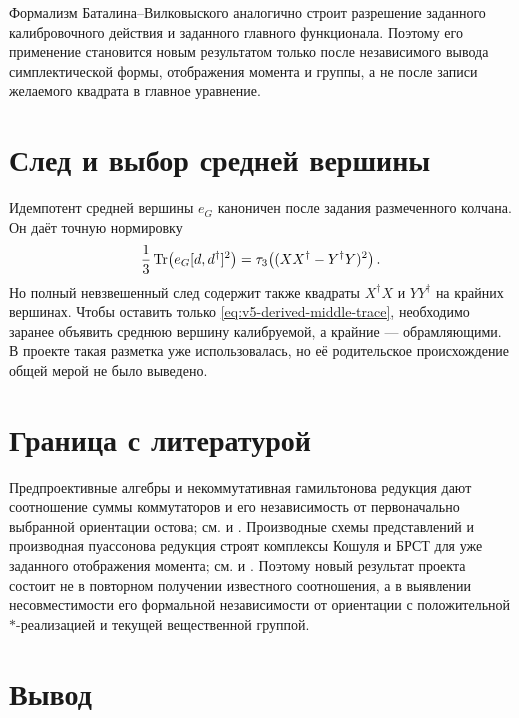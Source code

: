 Формализм Баталина--Вилковыского аналогично строит разрешение заданного
калибровочного действия и заданного главного функционала. Поэтому его
применение становится новым результатом только после независимого вывода
симплектической формы, отображения момента и группы, а не после записи
желаемого квадрата в главное уравнение.

\section{След и выбор средней вершины}

Идемпотент средней вершины \(e_G\) каноничен после задания размеченного
колчана. Он даёт точную нормировку
\begin{equation}
 \frac13\operatorname{Tr}\!\left(e_G[d,d^\dagger]^2\right)
 =\tau_3\!\left((XX^\dagger-Y^\dagger Y)^2\right).
 \label{eq:v5-derived-middle-trace}
\end{equation}
Но полный невзвешенный след содержит также квадраты \(X^\dagger X\) и
\(YY^\dagger\) на крайних вершинах. Чтобы оставить только
\eqref{eq:v5-derived-middle-trace}, необходимо заранее объявить среднюю
вершину калибруемой, а крайние --- обрамляющими. В проекте такая разметка
уже использовалась, но её родительское происхождение общей мерой не было
выведено.

\section{Граница с литературой}

Предпроективные алгебры и некоммутативная гамильтонова редукция дают
соотношение суммы коммутаторов и его независимость от первоначально
выбранной ориентации остова; см.
 и .
Производные схемы представлений и производная пуассонова редукция строят
комплексы Кошуля и БРСТ для уже заданного отображения момента; см.
 и .
Поэтому новый результат проекта состоит не в повторном получении известного
соотношения, а в выявлении несовместимости его формальной независимости от
ориентации с положительной \(*\)-реализацией и текущей вещественной группой.

\section{Вывод}

